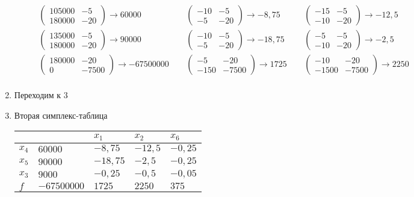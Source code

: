 \documentclass{article}
\begin{document}
\begin{enumerate}
\begin{enumerate}
    $\begin{aligned}
        &\begin{pmatrix} 105000 & -5 \\ 180000 & \boxed{-20} \end{pmatrix} \rightarrow 60000 \ & \
        &\begin{pmatrix} -10 & -5 \\ -5 & \boxed{-20} \end{pmatrix} \rightarrow -8{,}75 \ & \
        &\begin{pmatrix} -15 & -5 \\ -10 & \boxed{-20} \end{pmatrix} \rightarrow -12{,}5 \\
        &\begin{pmatrix} 135000 & -5 \\ 180000 & \boxed{-20} \end{pmatrix} \rightarrow 90000 \ & \
        &\begin{pmatrix} -10 & -5 \\ -5 & \boxed{-20} \end{pmatrix} \rightarrow -18{,}75 \ & \
        &\begin{pmatrix} -5 & -5 \\ -10 & \boxed{-20} \end{pmatrix} \rightarrow -2{,}5 \\
        &\begin{pmatrix} 180000 & \boxed{-20} \\ 0 & -7500 \end{pmatrix} \rightarrow -67500000 \ & \
        &\begin{pmatrix} -5 & \boxed{-20} \\ -150 & -7500 \end{pmatrix} \rightarrow 1725 \ & \
        &\begin{pmatrix} -10 & \boxed{-20} \\ -1500 & -7500 \end{pmatrix} \rightarrow 2250 \\
        \end{aligned}$
\end{enumerate}

\item Переходим к 3

\setcounter{enumi}{2}

\item Вторая симплекс-таблица

\begin{tabular}{ l | l | l | l | l }
    & & $x_1$ & $x_2$ & $x_6$ \\
    \hline
    $x_4$ & $60000$ & $-8{,}75$ & $-12{,}5$ & $-0{,}25$ \\
    $x_5$ & $90000$ & $-18{,}75$ & $-2{,}5$ & $-0{,}25$ \\
    $x_3$ & $9000$ & $-0{,}25$ & $-0{,}5$ & $-0{,}05$ \\
    \hline
    $f$   & $-67500000$ & $1725$ & $2250$ & $375$ \\
\end{tabular}


\end{enumerate}
\end{document}
